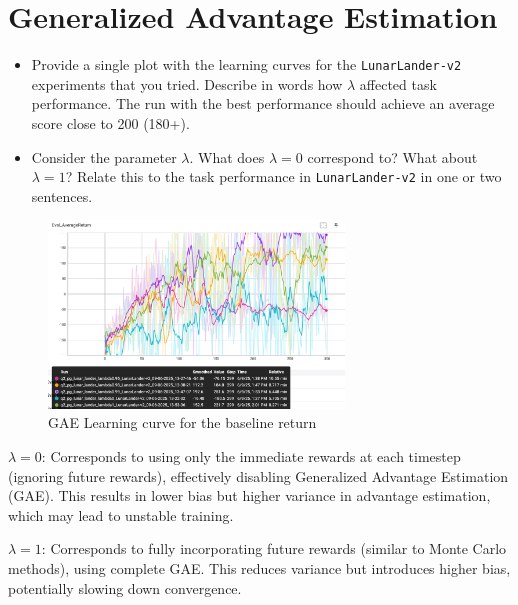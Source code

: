 \documentclass{article}
\begin{document}
\newpage\section{Generalized Advantage Estimation}
\begin{itemize}
    \item Provide a single plot with the learning curves for the \verb|LunarLander-v2| experiments that you tried. Describe in words how $\lambda$ affected task performance. The run with the best performance should achieve an average score close to 200 (180+).
    \item Consider the parameter $\lambda$. What does $\lambda = 0$ correspond to? What about $\lambda = 1$? Relate this to the task performance in \verb|LunarLander-v2| in one or two sentences.
\end{itemize}

\begin{figure}[H]
    \centering
    \includegraphics[width=0.7\textwidth]{img/GAE_return.png}
    \caption{GAE Learning curve for the baseline return}
    \label{fig:GAE_return}
\end{figure}

$\lambda = 0$: Corresponds to using only the immediate rewards at each timestep (ignoring future rewards), effectively disabling Generalized Advantage Estimation (GAE). This results in lower bias but higher variance in advantage estimation, which may lead to unstable training.

$\lambda = 1$: Corresponds to fully incorporating future rewards (similar to Monte Carlo methods), using complete GAE. This reduces variance but introduces higher bias, potentially slowing down convergence.
\end{document}
